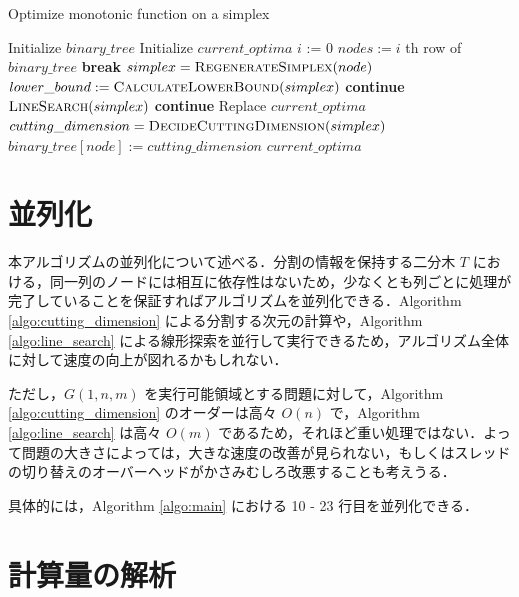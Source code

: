 \documentclass[a4paper,11pt]{jreport}
\newcommand{\Continue}{\State \textbf{continue} }
\newcommand{\Break}{\State \textbf{break} }
\begin{document}
\begin{algorithm}
\caption{Optimize monotonic function on a simplex}
\label{algo:main}
\begin{algorithmic}[1]
\State Initialize $ binary\_tree $
\State Initialize $ current\_optima $
\State $ i $ := 0
\State $ nodes := i $ th row of $ binary\_tree $
\Break
\EndIf
{}
\State $ simplex = \Call{RegenerateSimplex}{node} $
\State $ lower\_bound := \Call{CalculateLowerBound}{simplex} $
\Continue
\EndIf
{}
\State $ \Call{LineSearch}{simplex} $
\Continue
\EndIf
{}
\State Replace $ current\_optima $
\EndIf
\State $ cutting\_dimension = \Call{DecideCuttingDimension}{simplex} $
\State $ binary\_tree[node] := cutting\_dimension $
\EndFor
\EndWhile
\State \Return $ current\_optima $
\end{algorithmic}
\end{algorithm}

\section{並列化} \label{sec:parallel}

本アルゴリズムの並列化について述べる．分割の情報を保持する二分木 $ T $ における，同一列のノードには相互に依存性はないため，少なくとも列ごとに処理が完了していることを保証すればアルゴリズムを並列化できる．Algorithm \ref{algo:cutting_dimension} による分割する次元の計算や，Algorithm \ref{algo:line_search} による線形探索を並行して実行できるため，アルゴリズム全体に対して速度の向上が図れるかもしれない．\par
ただし，$ G(1, n, m) $ を実行可能領域とする問題に対して，Algorithm \ref{algo:cutting_dimension} のオーダーは高々 $ O(n) $ で，Algorithm \ref{algo:line_search} は高々 $ O(m) $ であるため，それほど重い処理ではない．よって問題の大きさによっては，大きな速度の改善が見られない，もしくはスレッドの切り替えのオーバーヘッドがかさみむしろ改悪することも考えうる．\par
具体的には，Algorithm \ref{algo:main} における 10 - 23 行目を並列化できる．

\section{計算量の解析} \label{sec:analysis}
\end{document}
